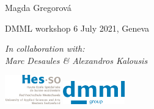 \documentclass[smaller]{beamer}
\begin{document}
{%

\begin{frame}
\center
\vspace{1em}
{\LARGE{}}

\vspace{2em}
{\large Magda Gregorov\'a}

\vspace{1em}
DMML workshop 6 July 2021, Geneva

\vspace{2em}
{\small\textit{In collaboration with:\\
Marc Desaules \& Alexandros Kalousis}}

\vfill
\includegraphics[width=0.18\textwidth]{HesLogo}
\hfill
\includegraphics[width=0.2\textwidth]{dmml_logo_MGblue}

\end{frame}

}
\addtocounter{framenumber}{-1}

\end{document}
